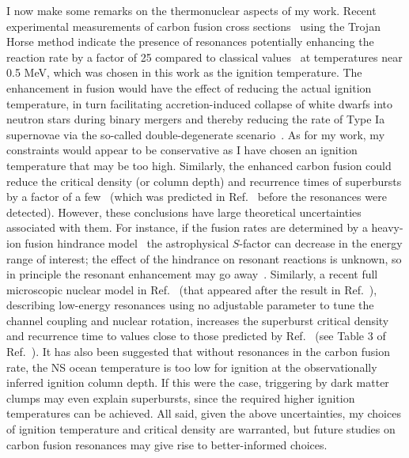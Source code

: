 \documentclass[
    twocolumn,
	prd,
        amssymb,
	preprintnumbers,
	secnumarabic,
	nofootinbib,
	superscriptaddress]{revtex4-1}
\begin{document}
I now make some remarks on the thermonuclear aspects of my work.
Recent experimental measurements of carbon fusion cross sections~\cite{FusionRatesTumino2018} using the
Trojan Horse method indicate the presence of resonances potentially enhancing the reaction rate by a factor of 25 compared to classical values~\cite{FusionRatesCaughlanFowler1988} 
at temperatures near 0.5 MeV, which was chosen in this work as the ignition temperature.
The enhancement in fusion would have the effect of reducing the actual ignition temperature, in turn facilitating accretion-induced collapse of white dwarfs into neutron stars during binary mergers and thereby reducing the rate of Type Ia supernovae via the so-called double-degenerate scenario~\cite{FusionRatesWD:Mori2018krw}.
As for my work, my constraints would appear to be conservative as I have chosen an ignition temperature that may be too high.
Similarly, the enhanced carbon fusion could reduce the critical density (or column depth) and recurrence times of superbursts by a factor of a few~\cite{FusionRatesSupburstDohi:2022gmm} (which was predicted in Ref.~\cite{FusionRatesWD:Cooper:2009ps} before the resonances were detected).
However, these conclusions have large theoretical uncertainties associated with them.
For instance, if the fusion rates are determined by a heavy-ion fusion hindrance model~\cite{FusionRatesWDHindrance:2007} the astrophysical $S$-factor can decrease in the energy range of interest; the effect of the hindrance on resonant reactions is unknown, so in principle the resonant enhancement may go away~\cite{FusionRatesWD:Mori2018krw}.
Similarly, a recent full microscopic
nuclear model in Ref.~\cite{FusionRatesFullMicroscopicModel:Taniguchi} (that appeared after the result in Ref.~\cite{FusionRatesTumino2018}), describing low-energy resonances using no adjustable parameter to tune the channel coupling and nuclear rotation, increases the superburst critical density and recurrence time to values close to those predicted by Ref.~\cite{FusionRatesCaughlanFowler1988} (see Table 3 of Ref.~\cite{FusionRatesSupburstDohi:2022gmm}).
It has also been suggested that without resonances in the carbon fusion rate, the NS ocean temperature is too low for ignition at the observationally inferred ignition column depth.
If this were the case, triggering by dark matter clumps may even explain superbursts, since the required higher ignition temperatures can be achieved. 
All said, given the above uncertainties, my choices of ignition temperature and critical density are warranted, but future studies on carbon fusion resonances may give rise to better-informed choices.
\end{document}
